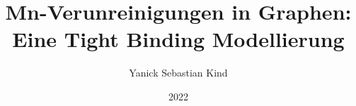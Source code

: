 \documentclass[
  tucolor,       %
  BCOR=12mm,     %
  parskip=half,  %
  open=any,      %
  cleardoublepage=plain,  %
]{tudothesis}
\author{Yanick Sebastian Kind}
\title{Mn-Verunreinigungen in Graphen: Eine Tight Binding Modellierung}
\date{2022}
\begin{document}
\frontmatter
\maketitle

\makecorrectorpage


\tableofcontents

\mainmatter




\appendix


\backmatter
\printbibliography

\cleardoublepage

\end{document}
